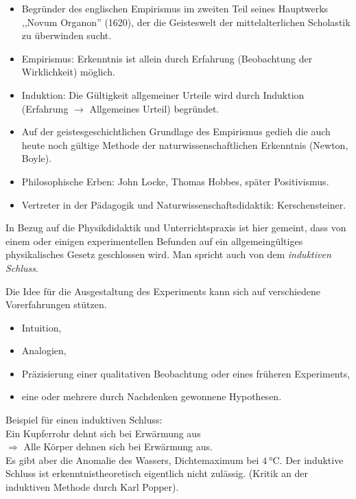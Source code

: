 \begin{itemize}
\item Begr\"{u}nder des englischen Empirismus im zweiten Teil seines
Hauptwerks ,,Novum Organon'' (1620), der die Geisteswelt der
mittelalterlichen Scholastik zu \"{u}berwinden sucht.
\item Empirismus: Erkenntnis ist allein durch Erfahrung
(Beobachtung der Wirklichkeit) m\"{o}glich.
\item Induktion: Die G\"{u}ltigkeit allgemeiner Urteile wird
durch Induktion (Erfahrung $\to$ Allgemeines Urteil)
begr\"{u}ndet.
\item Auf der geistes\-ge\-schicht\-lichen Grundlage
des Empirismus gedieh die auch heute noch g\"{u}ltige Methode der
naturwissenschaftlichen Erkenntnis (Newton, Boyle).
\item Philosophische Erben: John Locke, Thomas Hobbes,
sp\"{a}ter Positivismus.
\item
Vertreter in der P\"{a}dagogik und Naturwissenschafts\-didaktik:
Kerschensteiner.
\end{itemize}

In Bezug auf die Physikdidaktik und Unterrichtspraxis ist hier gemeint,
dass von einem oder einigen experimentellen Befunden auf ein
allgemeing\"{u}ltiges physikalisches Gesetz geschlossen wird.
Man spricht auch von dem \textit{induktiven Schluss}.

Die Idee f\"{u}r die Ausgestaltung des Experiments kann sich auf
verschiedene Vorerfahrungen st\"{u}tzen.

\begin{itemize}
\item Intuition,
\item Analogien,
\item Pr\"{a}zisierung einer qualitativen Beobachtung oder eines
fr\"{u}heren Experiments,
\item eine oder mehrere durch Nachdenken gewonnene Hypothesen.
\end{itemize}

\bip Beispiel f\"{u}r einen induktiven Schluss: \\[2ex]
Ein Kupferrohr dehnt sich bei Erw\"{a}rmung aus \\
$\Rightarrow$ \q Alle K\"{o}rper dehnen sich bei Erw\"{a}rmung aus. \\
\mip
Es gibt aber die Anomalie des Wassers, Dichtemaximum bei $\SI{4}{\celsius}$.
\bip
Der induktive Schluss ist erkenntnistheoretisch eigentlich
nicht zul\"{a}ssig. (Kritik an der induktiven Methode durch Karl Popper).

